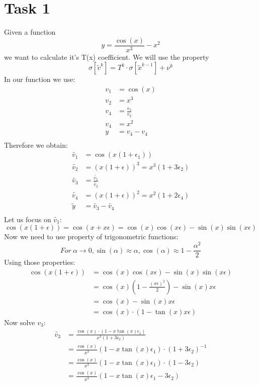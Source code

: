 \documentclass[11pt]{article}
\begin{document}
\section*{Task 1}
Given a function $$y = \frac{\cos(x)}{x^3} - x^2$$ we want to calculate it's T(x) coefficient.
We will use the property 
$$\sigma [\tilde{v}^k] = T^k \cdot \sigma[\tilde{x}^{k-1}] + \nu^k$$
In our function we use:
\begin{align*}
    v_1 &= \cos(x) \\ 
    v_2 &= x^3 \\ 
    v_4 &= \frac{v_1}{v_2} \\ 
    v_4 &= x^2 \\ 
    y &= v_4 - v_4 \\ 
\end{align*}
Therefore we obtain:
\begin{align*}
    \tilde{v_1} &= \cos(x(1+\epsilon_1)) \\ 
    \tilde{v_2} &= (x(1+\epsilon))^3 = x^3 (1+3\epsilon_2) \\ 
    \tilde{v_3} &= \frac{\tilde{v_1}}{\tilde{v_2}} \\ 
    \tilde{v_4} &= (x(1+\epsilon))^2 = x^2 (1+2\epsilon_4) \\
    \tilde{y} &= \tilde{v_3} - \tilde{v_4} \\ 
\end{align*}
Let us focus on $\tilde{ v_1 }$:
$$ \cos(x(1+\epsilon)) = \cos(x+x\epsilon) = \cos(x)\cos(x\epsilon) - \sin(x)\sin(x\epsilon) $$
Now we need to use property of trigonometric functions: 
$$For\ \alpha \rightarrow 0, \sin(\alpha) \approx \alpha , \cos(\alpha) \approx 1-\frac{ \alpha^2 }{ 2 }$$
Using those properties:
\begin{align*}
    \cos(x(1+\epsilon)) &= \cos(x)\cos(x\epsilon) - \sin(x)\sin(x\epsilon)\\
    &= \cos(x)(1-\frac{(x\epsilon)^2}{2}) - \sin(x)x\epsilon \\
    &= \cos(x) - \sin(x)x\epsilon\\
    &= \cos(x)\cdot (1-\tan(x)x\epsilon)
\end{align*}
Now solve $v_3$:
\begin{align*}
    \tilde{v_3} &= \displaystyle\frac{\cos(x) \cdot (1 - x\tan(x) \epsilon_1)}{x^3 (1+3\epsilon_2)}\\
    &= \frac{\cos(x)}{x^3} (1 - x\tan(x) \epsilon_1)\cdot (1+3\epsilon_2)^{-1}\\
    &= \frac{\cos(x)}{x^3} (1 - x\tan(x) \epsilon_1)\cdot (1-3\epsilon_2)\\
    &= \frac{\cos(x)}{x^3} (1 - x\tan(x) \epsilon_1 - 3\epsilon_2)\\
\end{align*}
\end{document}
